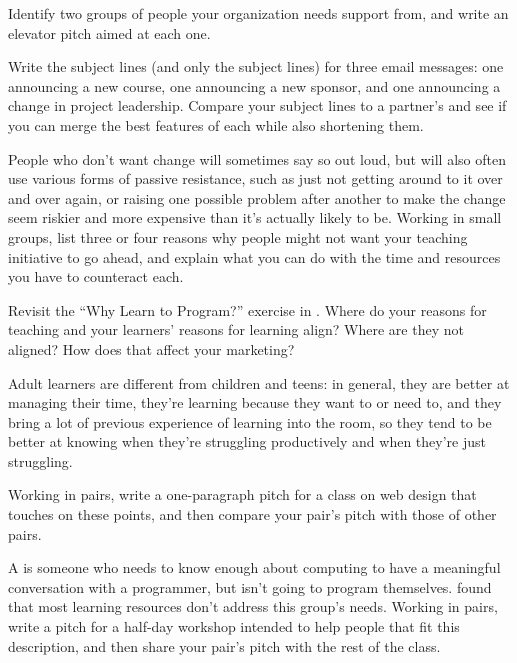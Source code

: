 
Identify two groups of people your organization needs support from,
and write an elevator pitch aimed at each one.


Write the subject lines (and only the subject lines) for three email
messages: one announcing a new course, one announcing a new sponsor,
and one announcing a change in project leadership.  Compare your
subject lines to a partner's and see if you can merge the best
features of each while also shortening them.


People who don't want change will sometimes say so out loud, but will
also often use various forms of passive resistance, such as just not
getting around to it over and over again, or raising one possible
problem after another to make the change seem riskier and more
expensive than it's actually likely to be. Working in small groups,
list three or four reasons why people might not want your teaching
initiative to go ahead, and explain what you can do with the time and
resources you have to counteract each.


Revisit the ``Why Learn to Program?''  exercise in
.  Where do your reasons for teaching and
your learners' reasons for learning align?  Where are they not
aligned?  How does that affect your marketing?


Adult learners are different from children and teens: in general, they
are better at managing their time, they're learning because they want
to or need to, and they bring a lot of previous experience of learning
into the room, so they tend to be better at knowing when they're
struggling productively and when they're just struggling.

Working in pairs, write a one-paragraph pitch for a class on web
design that touches on these points, and then compare your pair's
pitch with those of other pairs.


A  is
someone who needs to know enough about computing to have a meaningful
conversation with a programmer, but isn't going to program themselves.
\cite{Wang2018} found that most learning resources don't address this
group's needs.  Working in pairs, write a pitch for a half-day
workshop intended to help people that fit this description, and then
share your pair's pitch with the rest of the class.
